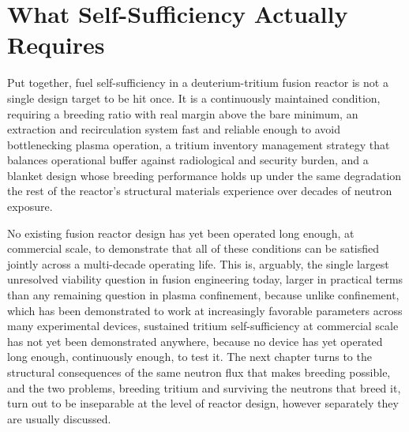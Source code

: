 \section{What Self-Sufficiency Actually Requires}

Put together, fuel self-sufficiency in a deuterium-tritium fusion reactor is not a single design target to be hit once. It is a continuously maintained condition, requiring a breeding ratio with real margin above the bare minimum, an extraction and recirculation system fast and reliable enough to avoid bottlenecking plasma operation, a tritium inventory management strategy that balances operational buffer against radiological and security burden, and a blanket design whose breeding performance holds up under the same degradation the rest of the reactor's structural materials experience over decades of neutron exposure.

No existing fusion reactor design has yet been operated long enough, at commercial scale, to demonstrate that all of these conditions can be satisfied jointly across a multi-decade operating life. This is, arguably, the single largest unresolved viability question in fusion engineering today, larger in practical terms than any remaining question in plasma confinement, because unlike confinement, which has been demonstrated to work at increasingly favorable parameters across many experimental devices, sustained tritium self-sufficiency at commercial scale has not yet been demonstrated anywhere, because no device has yet operated long enough, continuously enough, to test it. The next chapter turns to the structural consequences of the same neutron flux that makes breeding possible, and the two problems, breeding tritium and surviving the neutrons that breed it, turn out to be inseparable at the level of reactor design, however separately they are usually discussed.
